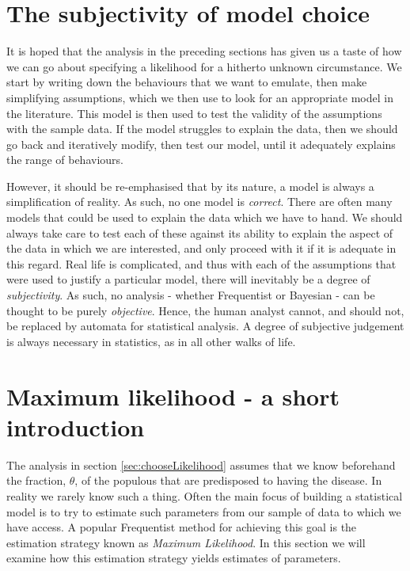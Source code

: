 \documentclass[11pt,fullpage]{book}
\begin{document}
\section{The subjectivity of model choice}
It is hoped that the analysis in the preceding sections has given us a taste of how we can go about specifying a likelihood for a hitherto unknown circumstance. We start by writing down the behaviours that we want to emulate, then make simplifying assumptions, which we then use to look for an appropriate model in the literature. This model is then used to test the validity of the assumptions with the sample data. If the model struggles to explain the data, then we should go back and iteratively modify, then test our model, until it adequately explains the range of behaviours.

However, it should be re-emphasised that by its nature, a model is always a simplification of reality. As such, no one model is \textit{correct}. There are often many models that could be used to explain the data which we have to hand. We should always take care to test each of these against its ability to explain the aspect of the data in which we are interested, and only proceed with it if it is adequate in this regard. Real life is complicated, and thus with each of the assumptions that were used to justify a particular model, there will inevitably be a degree of \textit{subjectivity}. As such, no analysis - whether Frequentist or Bayesian - can be thought to be purely \textit{objective}. Hence, the human analyst cannot, and should not, be replaced by automata for statistical analysis. A degree of subjective judgement is always necessary in statistics, as in all other walks of life.

\section{Maximum likelihood - a short introduction}\label{sec:Likelihood_MLE}
The analysis in section \ref{sec:chooseLikelihood} assumes that we know beforehand the fraction, $\theta$, of the populous that are predisposed to having the disease. In reality we rarely know such a thing. Often the main focus of building a statistical model is to try to estimate such parameters from our sample of data to which we have access. A popular Frequentist method for achieving this goal is the estimation strategy known as \textit{Maximum Likelihood}. In this section we will examine how this estimation strategy yields estimates of parameters.
\end{document}
